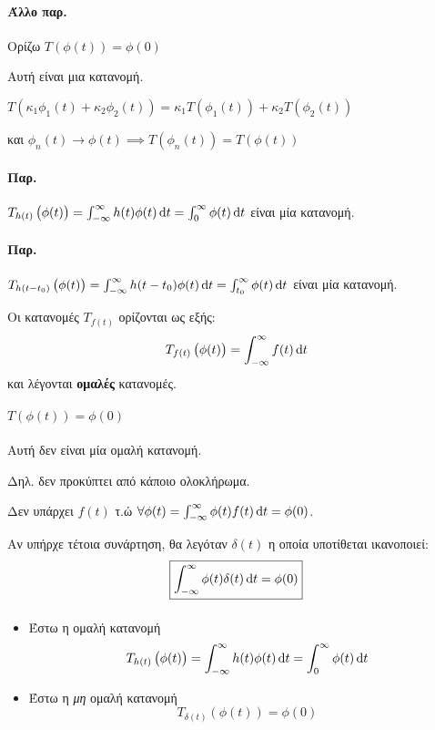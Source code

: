 \documentclass[11pt,a4paper,titlepage,final]{article}
\begin{document}
\paragraph{Άλλο παρ.}
Ορίζω \( T\left(\phi(t) \right) = \phi(0) \)

Αυτή είναι μια κατανομή.

\( T\left(\kappa_1 \phi_1(t) + \kappa_2\phi_2(t)\right) = \kappa_1T\left(\phi_1(t)\right) + \kappa_2 T\left(\phi_2(t)\right)\)

και \( \phi_n(t) \to \phi(t) \implies T\left(\phi_n(t) \right) = T\left(\phi(t) \right) \)

\paragraph{Παρ.}
\( T_{h(t)}\left(\phi(t) \right) = \int_{-\infty}^\infty h(t)\phi(t)\dif t = \int_0^\infty \phi(t)\dif t \) είναι μία κατανομή.

\paragraph{Παρ.}
\( T_{h(t-t_0)}\left(\phi(t) \right) = \int_{-\infty}^\infty h(t-t_0)\phi(t)\dif t = \int_{t_0}^\infty \phi(t)\dif t\) είναι μία κατανομή.

\begin{defn}{}{}
Οι κατανομές \( T_{f(t)} \) ορίζονται ως εξής:
\[
T_{f(t)}\left( \phi(t) \right) = \int_{-\infty}^\infty f(t) \dif t
\]
και λέγονται \textbf{ομαλές} κατανομές.
\end{defn}
\paragraph{\( T\left( \phi(t) \right) = \phi(0) \)}
Αυτή δεν είναι μία ομαλή κατανομή.

Δηλ. δεν προκύπτει από κάποιο ολοκλήρωμα.

Δεν υπάρχει \( f(t) \) τ.ώ \( \forall \phi(t) = \int_{-\infty}^\infty \phi(t)f(t)\dif t =\phi(0) \).

Αν υπήρχε τέτοια συνάρτηση, θα λεγόταν \( \delta(t) \) η οποία υποτίθεται ικανοποιεί:
\[
\boxed{
\int_{-\infty}^\infty \phi(t)\delta(t)\dif t = \phi(0)
}
\]

\paragraph{}

\begin{itemize}
\item Έστω η ομαλή κατανομή \[
T_{h(t)}\left(\phi(t) \right)  = \int_{-\infty}^\infty h(t)\phi(t)\dif t = \int_0^\infty \phi(t)\dif t
\]
\item Έστω η \textit{μη} ομαλή κατανομή \[
T_{\delta(t)} \left(\phi(t) \right) = \phi(0)
\]
\end{itemize}
\end{document}
